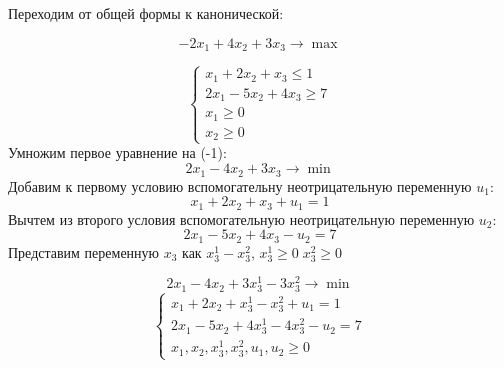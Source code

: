 \documentclass{report}
\begin{document}
Переходим от общей формы к канонической: 

\begin{equation}
	-2x_1+4x_2+3x_3 \to \max
\end{equation}

\begin{equation}
	\begin{cases}	
		x_1+2x_2+x_3\leq 1\\
		2x_1-5x_2+4x_3\geq 7\\
		x_1\geq0\\
		x_2\geq0
	\end{cases}
\end{equation}
Умножим первое уравнение на (-1):
\[2x_1-4x_2+3x_3 \to \min\]
Добавим к первому условию вспомогательну неотрицательную переменную $u_1$:
\[x_1+2x_2+x_3+u_1= 1\]
Вычтем из второго условия вспомогательную неотрицательную переменную $u_2$:
\[2x_1-5x_2+4x_3-u_2= 7\]
Представим переменную $x_3$ как $x_3^1-x_3^2$, $x_3^1\geq 0 \;x_3^2\geq 0$

\[2x_1-4x_2+3x_3^1-3x_3^2 \to \min\]
\begin{equation}
	\begin{cases}	
		x_1+2x_2+x_3^1-x_3^2+u_1= 1\\
		2x_1-5x_2+4x_3^1-4x_3^2-u_2= 7\\
		x_1,x_2,x_3^1,x_3^2,u_1,u_2\geq0
	\end{cases}
\end{equation}
\end{document}
